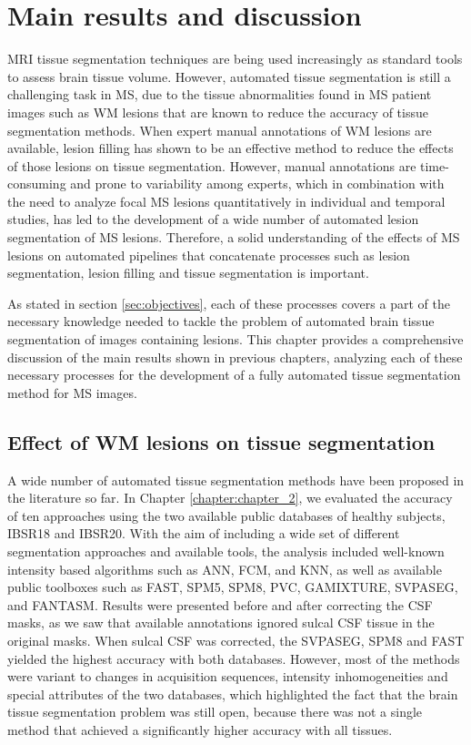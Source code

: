\chapter{Main results and discussion}

MRI tissue segmentation techniques are being used increasingly as standard tools to assess brain tissue volume. However, automated tissue segmentation is still a challenging task in MS, due to the tissue abnormalities found in MS patient images such as WM lesions that are known to reduce the accuracy of tissue segmentation methods. When expert manual annotations of WM lesions are available, lesion filling has shown to be an effective method to reduce the effects of those lesions on tissue segmentation. However, manual annotations are time-consuming and prone to variability among experts, which in combination with the need to analyze focal MS lesions quantitatively in individual and temporal studies, has led to the development of a wide number of automated lesion segmentation of MS lesions. Therefore, a solid understanding of the effects of MS lesions on automated pipelines that concatenate processes such as lesion segmentation, lesion filling and tissue segmentation is important. 

As stated in section \ref{sec:objectives}, each of these processes covers a part of the necessary knowledge needed to tackle the problem of automated brain tissue segmentation of images containing lesions. This chapter provides a comprehensive discussion of the main results shown in previous chapters, analyzing each of these necessary processes for the development of a fully automated tissue segmentation method for MS images.

\section{Effect of WM lesions on tissue segmentation}

A wide number of automated tissue segmentation methods have been proposed in the literature so far. In Chapter \ref{chapter:chapter_2}, we evaluated the accuracy of ten approaches using the two available public databases of healthy subjects, IBSR18 and IBSR20. With the aim of including a wide set of different segmentation approaches and available tools, the analysis included well-known intensity based algorithms such as ANN, FCM, and KNN, as well as available public toolboxes such as FAST, SPM5, SPM8, PVC, GAMIXTURE, SVPASEG, and FANTASM. Results were presented before and after correcting the CSF masks, as we saw that available annotations ignored sulcal CSF tissue in the original masks. When sulcal CSF was corrected, the SVPASEG, SPM8 and FAST yielded the highest accuracy with both databases.  However, most of the methods were variant to changes in acquisition sequences, intensity inhomogeneities and special attributes of the two databases,  which highlighted the fact that the brain tissue segmentation problem was still open, because there was not a single method that achieved a significantly higher accuracy with all tissues. 

